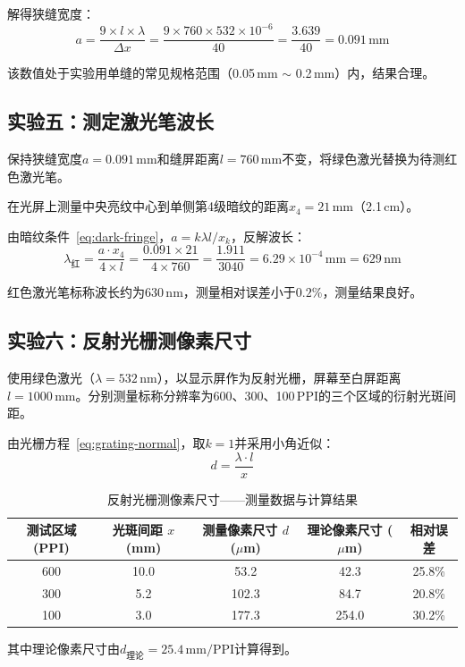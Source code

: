 \documentclass[UTF8]{article}
\begin{document}
解得狭缝宽度：
\[
a = \frac{9 \times l \times \lambda}{\Delta x}
  = \frac{9 \times 760 \times 532 \times 10^{-6}}{40}
  = \frac{3.639}{40}
  = 0.091\,\mathrm{mm}
\]

该数值处于实验用单缝的常见规格范围（0.05\,mm $\sim$ 0.2\,mm）内，结果合理。

\subsection{实验五：测定激光笔波长}

保持狭缝宽度$a = 0.091\,\mathrm{mm}$和缝屏距离$l = 760\,\mathrm{mm}$不变，将绿色激光替换为待测红色激光笔。

在光屏上测量中央亮纹中心到单侧第4级暗纹的距离$x_4 = 21\,\mathrm{mm}$（2.1\,cm）。

由暗纹条件~\eqref{eq:dark-fringe}，$a = k\lambda l / x_k$，反解波长：
\[
\lambda_{\text{红}} = \frac{a \cdot x_4}{4 \times l}
= \frac{0.091 \times 21}{4 \times 760}
= \frac{1.911}{3040}
= 6.29 \times 10^{-4}\,\mathrm{mm}
= 629\,\mathrm{nm}
\]

红色激光笔标称波长约为$630\,\mathrm{nm}$，测量相对误差小于$0.2\%$，测量结果良好。

\subsection{实验六：反射光栅测像素尺寸}

使用绿色激光（$\lambda = 532\,\mathrm{nm}$），以显示屏作为反射光栅，屏幕至白屏距离$l = 1000\,\mathrm{mm}$。分别测量标称分辨率为600、300、100\,PPI的三个区域的衍射光斑间距。

由光栅方程~\eqref{eq:grating-normal}，取$k=1$并采用小角近似：
\[
d = \frac{\lambda \cdot l}{x}
\]

\begin{table}[H]
\centering
\caption{反射光栅测像素尺寸——测量数据与计算结果}
\begin{tabular}{ccccc}
\toprule
测试区域 (PPI) & 光斑间距 $x$ (mm) & 测量像素尺寸 $d$ ($\mu$m) & 理论像素尺寸 ($\mu$m) & 相对误差 \\
\midrule
600 & 10.0 & 53.2 & 42.3 & 25.8\% \\
300 & 5.2 & 102.3 & 84.7 & 20.8\% \\
100 & 3.0 & 177.3 & 254.0 & 30.2\% \\
\bottomrule
\end{tabular}
\end{table}

其中理论像素尺寸由$d_{\text{理论}} = 25.4\,\mathrm{mm} / \mathrm{PPI}$计算得到。
\end{document}
